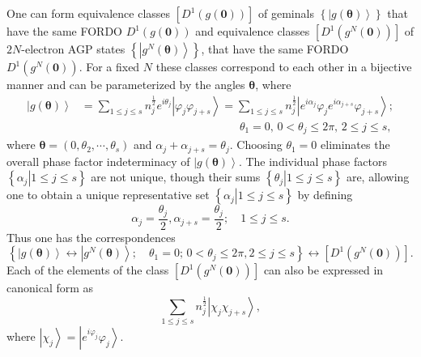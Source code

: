 \documentclass[titlepage]{article}%
\begin{document}
One can form equivalence classes $\left[  D^{1}\left(  g\left(  \bm{0}\right)
\right)  \right]  $ of geminals $\left\{  \left\vert g\left(
\bm{\theta}\right)  \right\rangle \right\}  $ that have the same FORDO
$D^{1}\left(  g\left(  \bm{0}\right)  \right)  $ and equivalence classes
$\left[  D^{1}\left(  g^{N}\left(  \bm{0}\right)  \right)  \right]  $ of
$2N$-electron AGP states $\left\{  \left\vert g^{N}\left(
\bm{\theta }\right)  \right\rangle \right\}  $, that have the same FORDO
$D^{1}\left(  g^{N}\left(  \bm{0}\right)  \right)  $. For a fixed $N$ these
classes correspond to each other in a bijective manner \cite{Yukalov00} and
can be parameterized by the angles $\bm{\theta}$, where
\begin{align}
\left\vert g\left(  \bm{\theta}\right)  \right\rangle  &  =\sum_{1\leq j\leq
s}n_{j}^{\frac{1}{2}}e^{i\theta_{j}}\left\vert \varphi_{j}\varphi
_{j+s}\right\rangle =\sum_{1\leq j\leq s}n_{j}^{\frac{1}{2}}\left\vert
e^{i\alpha_{j}}\varphi_{j}e^{i\alpha_{j+s}}\varphi_{j+s}\right\rangle
;\nonumber\\
&  \qquad\qquad\qquad\qquad\qquad\qquad\qquad\theta_{1}=0,\,0<\theta_{j}%
\leq2\pi,\,2\leq j\leq s,
\end{align}
where $\bm{\theta=}\left(  0,\theta_{2},\cdots,\theta_{s}\right)  $ and
$\alpha_{j}+\alpha_{j+s}=\theta_{j}$. Choosing $\theta_{1}=0$ eliminates the
overall phase factor indeterminacy of $\left\vert g\left(
\bm{\theta }\right)  \right\rangle $. The individual phase factors $\left\{
\left.  \alpha_{j}\right\vert 1\leq j\leq s\right\}  $ are not unique, though
their sums $\left\{  \left.  \theta_{j}\right\vert 1\leq j\leq s\right\}  $
are, allowing one to obtain a unique representative set $\left\{  \left.
\alpha_{j}\right\vert 1\leq j\leq s\right\}  $ by defining
\begin{equation}
\alpha_{j}=\frac{\theta_{j}}{2},\alpha_{j+s}=\frac{\theta_{j}}{2};\quad1\leq
j\leq s.
\end{equation}
Thus one has the correspondences
\begin{equation}
\left\{  \left\vert g\left(  \bm{\theta}\right)  \right\rangle
\longleftrightarrow\left\vert g^{N}\left(  \bm{\theta}\right)  \right\rangle
;\quad\theta_{1}=0;\,0<\theta_{j}\leq2\pi,2\leq j\leq s\right\}
\longleftrightarrow\left[  D^{1}\left(  g^{N}\left(  \bm{0}\right)  \right)
\right]  .
\end{equation}
Each of the elements of the class $\left[  D^{1}\left(  g^{N}\left(
\bm{0}\right)  \right)  \right]  $ can also be expressed in canonical form as
\begin{equation}
\sum_{1\leq j\leq s}n_{j}^{\frac{1}{2}}\left\vert \chi_{j}\chi_{j+s}%
\right\rangle ,
\end{equation}
where $\left\vert \chi_{j}\right\rangle =\left\vert e^{i\varphi_{j}}%
\varphi_{j}\right\rangle $.
\end{document}
